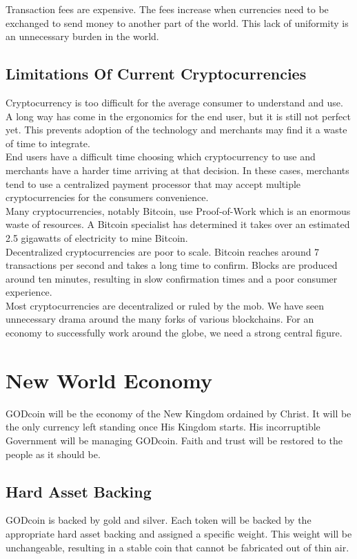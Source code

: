 \documentclass[12pt,a4paper]{article}
\begin{document}
  Transaction fees are expensive. The fees increase when currencies need to be
  exchanged to send money to another part of the world. This lack of uniformity
  is an unnecessary burden in the world.

  \subsection{Limitations Of Current Cryptocurrencies}
  Cryptocurrency is too difficult for the average consumer to understand and
  use. A long way has come in the ergonomics for the end user, but it is still
  not perfect yet. This prevents adoption of the technology and merchants may
  find it a waste of time to integrate.\\

  End users have a difficult time choosing which cryptocurrency to use and
  merchants have a harder time arriving at that decision. In these cases,
  merchants tend to use a centralized payment processor that may accept multiple
  cryptocurrencies for the consumers convenience.\\

  Many cryptocurrencies, notably Bitcoin, use Proof-of-Work which is an enormous
  waste of resources. A Bitcoin specialist has determined it takes over an
  estimated 2.5 gigawatts of electricity to mine Bitcoin.\\

  Decentralized cryptocurrencies are poor to scale. Bitcoin reaches around 7
  transactions per second and takes a long time to confirm. Blocks are produced
  around ten minutes, resulting in slow confirmation times and a poor consumer
  experience.\\

  Most cryptocurrencies are decentralized or ruled by the mob. We have seen
  unnecessary drama around the many forks of various blockchains. For an economy
  to successfully work around the globe, we need a strong central figure.

  \section{New World Economy}
  GODcoin will be the economy of the New Kingdom ordained by Christ. It will be
  the only currency left standing once His Kingdom starts. His incorruptible
  Government will be managing GODcoin. Faith and trust will be restored to the
  people as it should be.

  \subsection{Hard Asset Backing}
  GODcoin is backed by gold and silver. Each token will be backed by the
  appropriate hard asset backing and assigned a specific weight. This weight
  will be unchangeable, resulting in a stable coin that cannot be fabricated out
  of thin air.\\
\end{document}
